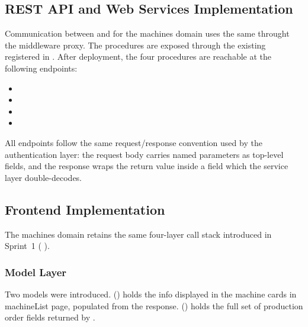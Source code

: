 \subsection{REST API and Web Services Implementation}

Communication between  and  for the
machines domain uses the same  throught the middleware proxy.
The procedures are exposed through the existing 
registered in . After deployment,
the four procedures are reachable at the following endpoints:
\begin{itemize}
  \item {}
  \item {}
  \item {}
  \item {}
\end{itemize}

All endpoints follow the same  request/response convention used
by the authentication layer: the request body carries named parameters as
top-level  fields, and the response wraps the 
return value inside a  field which the  service
layer double-decodes.

\subsection{Frontend Implementation}
The machines domain retains the same four-layer call stack introduced in
Sprint~1 ( \textrightarrow{} 
\textrightarrow{}  \textrightarrow{} ).

\subsubsection*{Model Layer}

Two models were introduced.
 () holds the
info displayed in the machine cards in machineList page, populated
from the  response.
 () holds the
full set of production order fields returned by .


